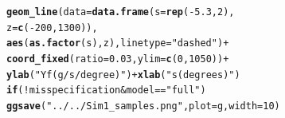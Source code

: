 \documentclass[a4paper,11pt]{article}\usepackage[]{graphicx}\usepackage[]{color}
\makeatletter
\newcommand{\hlnum}[1]{\textcolor[rgb]{0.686,0.059,0.569}{#1}}%
\newcommand{\hlstr}[1]{\textcolor[rgb]{0.192,0.494,0.8}{#1}}%
\newcommand{\hlopt}[1]{\textcolor[rgb]{0,0,0}{#1}}%
\newcommand{\hlstd}[1]{\textcolor[rgb]{0.345,0.345,0.345}{#1}}%
\newcommand{\hlkwa}[1]{\textcolor[rgb]{0.161,0.373,0.58}{\textbf{#1}}}%
\newcommand{\hlkwc}[1]{\textcolor[rgb]{0.333,0.667,0.333}{#1}}%
\newcommand{\hlkwd}[1]{\textcolor[rgb]{0.737,0.353,0.396}{\textbf{#1}}}%
\newenvironment{kframe}{%
 \def\at@end@of@kframe{}%
 \ifinner\ifhmode%
  \def\at@end@of@kframe{\end{minipage}}%
  \begin{minipage}{\columnwidth}%
 \fi\fi%
 \def\FrameCommand##1{\hskip\@totalleftmargin \hskip-\fboxsep
 \colorbox{shadecolor}{##1}\hskip-\fboxsep
     \hskip-\linewidth \hskip-\@totalleftmargin \hskip\columnwidth}%
 \MakeFramed {\advance\hsize-\width
   \@totalleftmargin\z@ \linewidth\hsize
   \@setminipage}}%
 {\par\unskip\endMakeFramed%
 \at@end@of@kframe}
\newenvironment{knitrout}{}{} %
\makeatother
\begin{document}
\begin{knitrout}
\begin{kframe}
\begin{alltt}
  \hlkwd{geom_line}\hlstd{(}\hlkwc{data}\hlstd{=}\hlkwd{data.frame}\hlstd{(}\hlkwc{s}\hlstd{=}\hlkwd{rep}\hlstd{(}\hlopt{-}\hlnum{5.3}\hlstd{,}\hlnum{2}\hlstd{),}
                            \hlkwc{z}\hlstd{=}\hlkwd{c}\hlstd{(}\hlopt{-}\hlnum{200}\hlstd{,}\hlnum{1300}\hlstd{)),}
            \hlkwd{aes}\hlstd{(}\hlkwd{as.factor}\hlstd{(s),z),}\hlkwc{linetype}\hlstd{=}\hlstr{"dashed"}\hlstd{)} \hlopt{+}
  \hlkwd{coord_fixed}\hlstd{(}\hlkwc{ratio} \hlstd{=} \hlnum{0.03}\hlstd{,} \hlkwc{ylim}\hlstd{=}\hlkwd{c}\hlstd{(}\hlnum{0}\hlstd{,}\hlnum{1050}\hlstd{))} \hlopt{+}
  \hlkwd{ylab}\hlstd{(}\hlstr{"Yf (g/s/degree)"}\hlstd{)} \hlopt{+} \hlkwd{xlab}\hlstd{(}\hlstr{"s (degrees)"}\hlstd{)}
\hlkwa{if}\hlstd{(}\hlopt{!}\hlstd{misspecification} \hlopt{&} \hlstd{model}\hlopt{==}\hlstr{"full"}\hlstd{)}
  \hlkwd{ggsave}\hlstd{(}\hlstr{"../../Sim1_samples.png"}\hlstd{,}\hlkwc{plot} \hlstd{= g,}\hlkwc{width}\hlstd{=}\hlnum{10}\hlstd{)}
\end{alltt}


{\ttfamily\noindent\itshape\color{messagecolor}{\#\# Saving 10 x 7 in image}}\end{kframe}
\end{knitrout}
\end{document}
